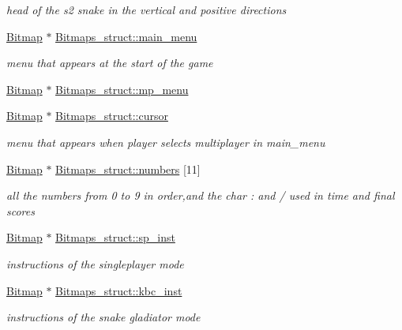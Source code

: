 \begin{DoxyCompactItemize}
\begin{DoxyCompactList}\small\item\em head of the s2 snake in the vertical and positive directions \end{DoxyCompactList}\item 
\hyperlink{structBitmap}{Bitmap} $\ast$ \hyperlink{group__graphics_ga024eb6d4380a6df2938202e45547c241}{Bitmaps\+\_\+struct\+::main\+\_\+menu}
\begin{DoxyCompactList}\small\item\em menu that appears at the start of the game \end{DoxyCompactList}\item 
\hyperlink{structBitmap}{Bitmap} $\ast$ \hyperlink{group__graphics_ga65a5f6d63fc1498c0bace1310dac202f}{Bitmaps\+\_\+struct\+::mp\+\_\+menu}
\item 
\hyperlink{structBitmap}{Bitmap} $\ast$ \hyperlink{group__graphics_gaa9e2b675fd059f98d6fc79bff67f7918}{Bitmaps\+\_\+struct\+::cursor}
\begin{DoxyCompactList}\small\item\em menu that appears when player selects multiplayer in main\+\_\+menu \end{DoxyCompactList}\item 
\hyperlink{structBitmap}{Bitmap} $\ast$ \hyperlink{group__graphics_ga055c85bff730277d284b6e00bb7d1b62}{Bitmaps\+\_\+struct\+::numbers} \mbox{[}11\mbox{]}
\begin{DoxyCompactList}\small\item\em all the numbers from 0 to 9 in order,and the char \textquotesingle{}\+:\textquotesingle{} and \textquotesingle{}/\textquotesingle{} used in time and final scores \end{DoxyCompactList}\item 
\hyperlink{structBitmap}{Bitmap} $\ast$ \hyperlink{group__graphics_ga067f54df47f8ccad03f63d3b683f73a5}{Bitmaps\+\_\+struct\+::sp\+\_\+inst}
\begin{DoxyCompactList}\small\item\em instructions of the singleplayer mode \end{DoxyCompactList}\item 
\hyperlink{structBitmap}{Bitmap} $\ast$ \hyperlink{group__graphics_ga4096188495e68d783bf3b8ac7871b7fa}{Bitmaps\+\_\+struct\+::kbc\+\_\+inst}
\begin{DoxyCompactList}\small\item\em instructions of the snake gladiator mode \end{DoxyCompactList}\item 

\end{DoxyCompactItemize}
